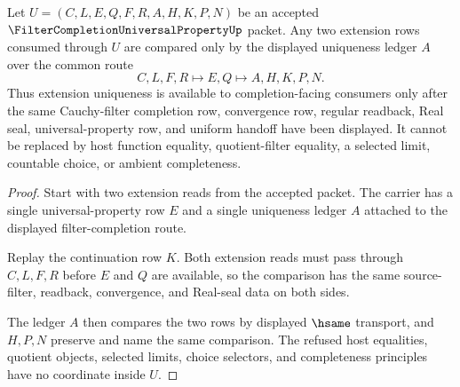\begin{theorem}
\label{thm:filter-completion-universal-property-extension-uniqueness}
Let $U=(C,L,E,Q,F,R,A,H,K,P,N)$ be an accepted $\FilterCompletionUniversalPropertyUp$ packet. Any two extension rows consumed through $U$ are compared only by the displayed uniqueness ledger $A$ over the common route
$$
C,L,F,R \longmapsto E,Q \longmapsto A,H,K,P,N .
$$
Thus extension uniqueness is available to completion-facing consumers only after the same Cauchy-filter completion row, convergence row, regular readback, Real seal, universal-property row, and uniform handoff have been displayed. It cannot be replaced by host function equality, quotient-filter equality, a selected limit, countable choice, or ambient completeness.
\end{theorem}
\begin{proof}
Start with two extension reads from the accepted packet. The carrier has a single universal-property row $E$ and a single uniqueness ledger $A$ attached to the displayed filter-completion route.

Replay the continuation row $K$. Both extension reads must pass through $C,L,F,R$ before $E$ and $Q$ are available, so the comparison has the same source-filter, readback, convergence, and Real-seal data on both sides.

The ledger $A$ then compares the two rows by displayed $\hsame$ transport, and $H,P,N$ preserve and name the same comparison. The refused host equalities, quotient objects, selected limits, choice selectors, and completeness principles have no coordinate inside $U$.
\end{proof}

